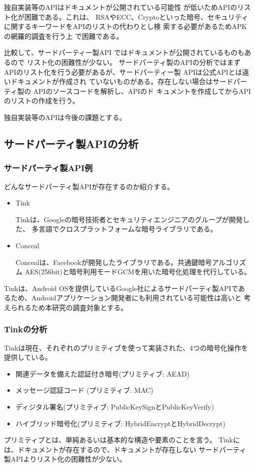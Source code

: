 独自実装等のAPIはドキュメントが公開されている可能性
が低いためAPIのリスト化が困難である。これは、
RSAやECC、Cryptoといった暗号、セキュリティ
に関するキーワードをAPIのリストの代わりとし検
索する必要があるためAPKの網羅的調査を行う上
で困難である。

比較して、サードパーティー製API
ではドキュメントが公開されているものもあるので
リスト化の困難性が少ない。
サードパーティ製のAPIの分析ではまずAPIのリスト化を行う必要があるが、サードパーティー製
APIは公式APIとは違いドキュメントが作成され
ていないものがある。存在しない場合はサードパー
ティ製の APIのソースコードを解析し、APIのド
キュメントを作成してからAPIのリストの作成を行う。

独自実装等のAPIは今後の課題とする。

\subsection{サードパーティ製APIの分析}

\subsubsection{サードパーティ製API例}
どんなサードパーティ製APIが存在するのか紹介する。
\begin{itemize}
\item Tink　

Tinkは、Googleの暗号技術者とセキュリティエンジニアのグループが開発した、
多言語でクロスプラットフォームな暗号ライブラリである。

\item Conceal

Concealは、Facebookが開発したライブラリである。共通鍵暗号アルゴリズム AES(256bit)と暗号利用モードGCMを用いた暗号化処理を代行している。

\end{itemize}
Tinkは、Android OSを提供しているGoogle社によるサードパーティ製APIであるため、Androidアプリケーション開発者にも利用されている可能性は高いと
考えられるため本研究の調査対象とする。


\subsubsection{Tinkの分析}

Tinkは現在、それぞれのプリミティブを使って実装された、4つの暗号化操作を提供している。
\begin{itemize}
\item 関連データを備えた認証付き暗号(プリミティブ: AEAD)
\item メッセージ認証コード (プリミティブ: MAC)
\item ディジタル署名(プリミティブ: PublicKeySignとPublicKeyVerify)
\item ハイブリッド暗号化(プリミティブ: HybridEncryptとHybridDecrypt)
\end{itemize}
プリミティブとは、単純あるいは基本的な構造や要素のことを言う。
Tinkには、ドキュメントが存在するので、ドキュメントが存在しない
サードパーティ製APIよりリスト化の困難性が少ない。


